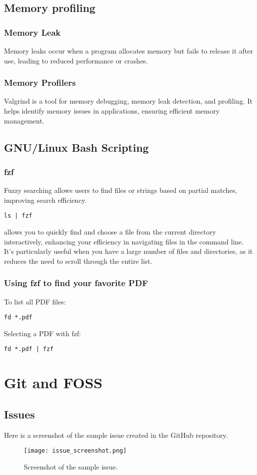 \documentclass{article}
\begin{document}
\subsection{Memory profiling}  
\subsubsection{Memory Leak}
Memory leaks occur when a program allocates memory but fails to release it after use, leading to reduced performance or crashes.
\subsubsection{Memory Profilers}  
Valgrind is a tool for memory debugging, memory leak detection, and profiling. It helps identify memory issues in applications, ensuring efficient memory management.
\subsection{GNU/Linux Bash Scripting}
\subsubsection{fzf}  
Fuzzy searching allows users to find files or strings based on partial matches, improving search efficiency.
\begin{verbatim}  
ls | fzf 
\end{verbatim}  
allows you to quickly find and choose a file from the current directory interactively, enhancing your efficiency in navigating files in the command line. It's particularly useful when you have a large number of files and directories, as it reduces the need to scroll through the entire list.
\subsubsection{Using fzf to find your favorite PDF}
To list all PDF files:  
\begin{verbatim}  
fd *.pdf  
\end{verbatim}  
Selecting a PDF with fzf:  
\begin{verbatim}  
fd *.pdf | fzf  
\end{verbatim}
\section{Git and FOSS}
\subsection{Issues}
Here is a screenshot of the sample issue created in the GitHub repository.  

\begin{figure}[h]  
  \centering  
  \texttt{[image: issue\_screenshot.png]}  
  \caption{Screenshot of the sample issue.}  
  \label{fig:issue_screenshot}  
\end{figure}  
\end{document}
